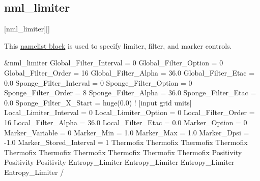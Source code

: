 \subsection{nml\_limiter}
\label{SEC:nml_limiter}
\inp*[nmlLimiter]{}[nml\_limiter][]

This \hyperref[SEC:User_Input]{namelist block}
is used to specify limiter, filter, and marker controls.

\begin{nmlblocklst}[
,label={LST:nml_limiter}
,caption={Namelist nml\_limiter.}
]
&nml_limiter
  Global_Filter_Interval      =  0
  Global_Filter_Option        =  0
  Global_Filter_Order         = 16
  Global_Filter_Alpha         = 36.0
  Global_Filter_Etac          =  0.0
  Sponge_Filter_Interval      =  0
  Sponge_Filter_Option        =  0
  Sponge_Filter_Order         =  8
  Sponge_Filter_Alpha         = 36.0
  Sponge_Filter_Etac          =  0.0
  Sponge_Filter_X_Start       = huge(0.0)  ! [input grid units]
  Local_Limiter_Interval      =  0
  Local_Limiter_Option        =  0
  Local_Filter_Order          = 16
  Local_Filter_Alpha          = 36.0
  Local_Filter_Etac           =  0.0
  Marker_Option               =  0
  Marker_Variable             =  0
  Marker_Min                  =  1.0
  Marker_Max                  =  1.0
  Marker_Dpsi                 = -1.0
  Marker_Stored_Interval      =  1
  Thermofix%
  Thermofix%
  Thermofix%
  Thermofix%
  Thermofix%
  Thermofix%
  Thermofix%
  Thermofix%
  Thermofix%
  Thermofix%
  Positivity%
  Positivity%
  Positivity%
  Entropy_Limiter%
  Entropy_Limiter%
  Entropy_Limiter%
  Entropy_Limiter%
/
\end{nmlblocklst}


